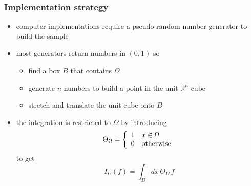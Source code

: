 \begin{frame}[fragile]
%
  \frametitle{Implementation strategy}
%
  \begin{itemize}
%
  \item computer implementations require a pseudo-random number generator to build the sample
%
    \item most generators return numbers in $(0,1)$ so
      \begin{itemize}
      \item find a box $B$ that contains $\Omega$
      \item generate $n$ numbers to build a point in the unit $\mathbb{R}^{n}$ cube
      \item stretch and translate the unit cube onto $B$
      \end{itemize}
%
  \item the integration is restricted to $\Omega$ by introducing
    \begin{equation}
        \Theta_{\Omega}
        =
        \left\{
          \begin{array}{ll}
            1 & x \in \Omega \\
            0 & {\rm otherwise}
          \end{array}
        \right.
        \label{eq:theta}
    \end{equation}
    to get
    \begin{equation}
      I_{\Omega} (f)
      =
      \int_{B} dx \, \Theta_{\Omega} \, f
      \label{eq:integral-box}
    \end{equation}
%
  \end{itemize}
%
\end{frame}

